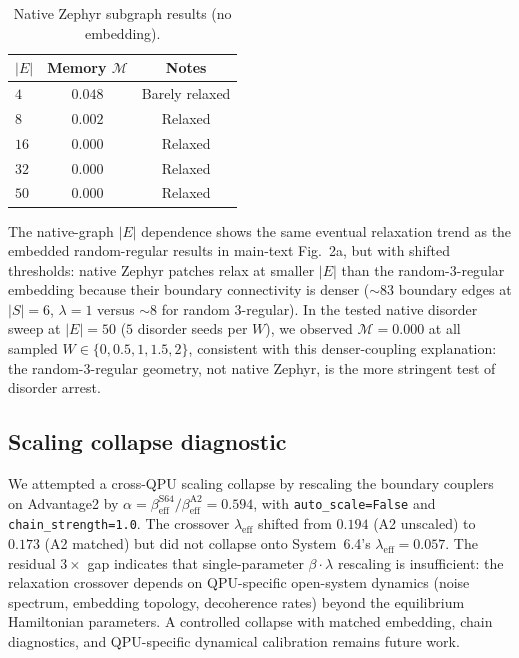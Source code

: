 \documentclass[aps,prapplied,reprint,superscriptaddress,floatfix,nofootinbib]{revtex4-2}
\begin{document}
\begin{table}[!htbp]
\centering
\caption{Native Zephyr subgraph results (no embedding).}
\label{tab:phase7_native}
\small
\begin{tabular}{lcc}
\toprule
$|E|$ & Memory $\mathcal{M}$ & Notes \\
\midrule
$4$  & $0.048$ & Barely relaxed \\
$8$  & $0.002$ & Relaxed \\
$16$ & $0.000$ & Relaxed \\
$32$ & $0.000$ & Relaxed \\
$50$ & $0.000$ & Relaxed \\
\bottomrule
\end{tabular}
\end{table}

The native-graph $|E|$ dependence shows the same eventual relaxation
trend as the embedded random-regular results in main-text Fig.~2a, but
with shifted thresholds: native Zephyr patches relax at smaller $|E|$
than the random-3-regular embedding because their boundary connectivity
is denser ($\sim\!83$ boundary edges at $|S|=6$, $\lambda=1$ versus
$\sim\!8$ for random 3-regular).  In the tested native disorder sweep
at $|E|=50$ ($5$ disorder seeds per $W$), we observed
$\mathcal{M}=0.000$ at all sampled $W\in\{0,0.5,1,1.5,2\}$, consistent
with this denser-coupling explanation: the random-3-regular geometry,
not native Zephyr, is the more stringent test of disorder arrest.

\subsection{Scaling collapse diagnostic}
\label{sec:phase7_scaling}

We attempted a cross-QPU scaling collapse by rescaling the boundary
couplers on Advantage2 by $\alpha=\beta_\mathrm{eff}^\mathrm{S64}/\beta_\mathrm{eff}^\mathrm{A2}=0.594$, with \texttt{auto\_scale=False} and
\texttt{chain\_strength=1.0}.  The crossover $\lambda_\mathrm{eff}$
shifted from $0.194$ (A2 unscaled) to $0.173$ (A2 matched) but did
not collapse onto System~6.4's $\lambda_\mathrm{eff}=0.057$.
The residual $3\times$ gap indicates that single-parameter
$\beta\cdot\lambda$ rescaling is insufficient: the relaxation
crossover depends on QPU-specific open-system dynamics (noise spectrum,
embedding topology, decoherence rates) beyond the equilibrium
Hamiltonian parameters.  A controlled collapse with matched embedding,
chain diagnostics, and QPU-specific dynamical calibration remains
future work.



\end{document}
